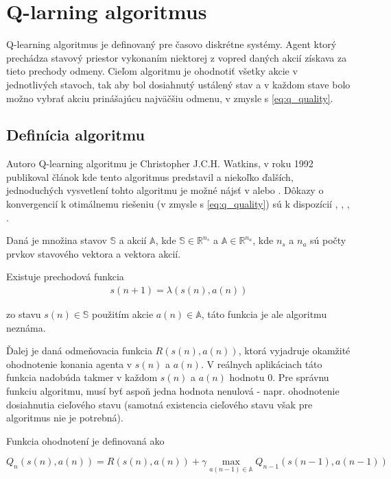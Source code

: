 \chapter{Q-larning algoritmus}

Q-learning algoritmus je definovaný pre časovo diskrétne systémy.
Agent ktorý prechádza stavový priestor vykonaním niektorej z vopred daných
akcií získava za tieto prechody odmeny. Cieľom algoritmu je ohodnotiť všetky akcie
v jednotlivých stavoch, tak aby bol dosiahnutý ustálený stav a v každom stave
bolo možno vybrať akciu prinášajúcu najväčšiu odmenu, v zmysle
s \ref{eq:q_quality}.


\section{Definícia algoritmu}

Autoro Q-learning algoritmu je Christopher  J.C.H. Watkins, v roku 1992 publikoval
článok kde tento algoritmus predstavil \cite{bib:q_learning_watkins} a niekoľko ďalších,
jednoduchých vysvetlení tohto algoritmu je možné nájsť v \cite{bib:q_tutorial_01} alebo
\cite{bib:q_tutorial_02}. Dôkazy o konvergencií k otimálnemu riešeniu (v zmysle
s \ref{eq:q_quality}) sú k dispozícií \cite{bib:q_proof_01}, \cite{bib:q_proof_02},
\cite{bib:q_proof_03}, \cite{bib:q_proof_04}.

Daná je množina stavov $\mathbb{S}$ a akcií $\mathbb{A}$, kde
 $\mathbb{S} \in \mathbb{R}^{n_s}$ a $\mathbb{A} \in \mathbb{R}^{n_a}$, kde
$n_s$ a  $n_a$ sú počty prvkov stavového vektora a vektora akcií.

Existuje prechodová funkcia
\begin{align}
        s(n+1) = \lambda(s(n), a(n))
\end{align}

zo stavu $s(n) \in \mathbb{S}$ použitím akcie $a(n) \in \mathbb{A}$, táto funkcia je ale algoritmu neznáma.

Ďalej je daná odmeňovacia funkcia $R(s(n),a(n))$, ktorá vyjadruje okamžité ohodnotenie konania
agenta v $s(n)$ a $a(n)$. V reálnych aplikáciach táto funkcia nadobúda takmer v každom
$s(n)$ a $a(n)$ hodnotu $0$. Pre správnu funkciu algoritmu, musí byť aspoň jedna hodnota
nenulová - napr. ohodnotenie dosiahnutia cieľového stavu (samotná existencia cieľového
stavu však pre algoritmus nie je potrebná).

Funkcia ohodnotení je definovaná ako

\begin{equation}
Q_{n}(s(n),a(n)) = R(s(n),a(n)) + \gamma \max_{a(n-1) \in \mathbb{A}} Q_{n-1}(s(n-1), a(n-1))
\label{eq:q_learning}
\end{equation}

